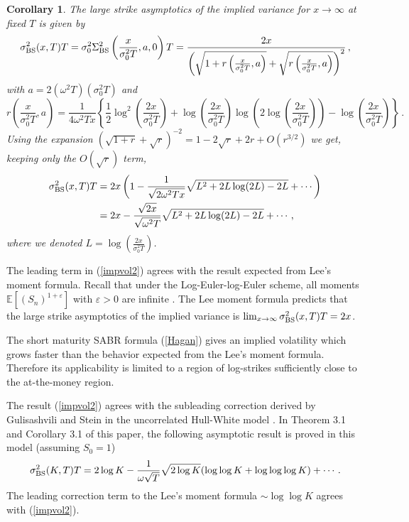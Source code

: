 \documentclass[11pt]{article}
\numberwithin{equation}{section}
\theoremstyle{plain}
\newtheorem{corollary}[theorem]{Corollary}
\begin{document}
\begin{corollary}
The large strike asymptotics of the implied variance for $x \to \infty$
at fixed $T$ is given by
\begin{equation}
\sigma_{\rm BS}^2(x,T) T= 
\sigma_0^2 \Sigma_{\rm BS}^2
\left( \frac{x}{\sigma_0^2 T},a,0\right) T =
\frac{2x}{\left(\sqrt{1+r\left(\frac{x}{\sigma_0^2 T},a\right)} 
 + \sqrt{r\left(\frac{x}{\sigma_0^2 T},a\right)}\right)^2} \,,
\end{equation}
with $a = 2(\omega^2 T)(\sigma_0^2 T)$ and 
\begin{equation}
r\left(\frac{x}{\sigma_0^2 T},a\right) = \frac{1}{4\omega^2 T x}
\left\{ \frac12 \log^2 \left( \frac{2x}{\sigma_0^2 T} \right) + 
\log\left( \frac{2x}{\sigma_0^2 T} \right)
\log\left( 2\log \left(\frac{2x}{\sigma_0^2 T} \right)\right) -
\log\left( \frac{2x}{\sigma_0^2 T} \right) \right\}\,.
\end{equation}
Using the expansion $(\sqrt{1+r} + \sqrt{r})^{-2} = 1 - 2\sqrt{r} + 2r + O(r^{3/2})$
we get, keeping only the $O(\sqrt{r})$ term,
\begin{align}\label{impvol2}
\sigma_{\rm BS}^2(x,T)T &= 2x \left( 1 - \frac{1}{\sqrt{2\omega^2 T x}}
\sqrt{L^2 + 2 L \log(2L) - 2L} + \cdots \right) \\
&= 2x - \frac{\sqrt{2x}}{\sqrt{\omega^2 T}} 
\sqrt{L^2 + 2 L \log(2L) - 2L} + \cdots\,, \nonumber
\end{align}
where we denoted $L=\log\left( \frac{2x}{\sigma_0^2 T}\right)$.
\end{corollary}

The leading term in (\ref{impvol2}) agrees with the result expected from Lee's moment 
formula. Recall that under the Log-Euler-log-Euler scheme, all moments $\mathbb{E}[(S_n)^{1+\varepsilon}]$ with
$\varepsilon>0$ are infinite \cite{PZStochVol}. The Lee moment formula 
\cite{Lee} predicts that the large strike asymptotics of the 
implied variance is $\lim_{x\to \infty} \sigma_{\rm BS}^2(x,T) T = 2x$. 

The short maturity SABR formula (\ref{Hagan}) gives an implied volatility which 
grows faster than
the behavior expected from the Lee's moment formula. Therefore its applicability
is limited to a region of log-strikes sufficiently close to the at-the-money
region.

The result (\ref{impvol2}) agrees with the subleading correction
derived by Gulisashvili and Stein in the uncorrelated Hull-White model 
\cite{GSHW}. In Theorem 3.1 and Corollary 3.1 of this paper, the following
asymptotic result is proved in this model (assuming $S_0=1$)
\begin{equation}
\sigma_{\rm BS}^2(K,T) T = 2\log K - \frac{1}{\omega\sqrt{T}} \sqrt{2\log K}
( \log\log K + \log\log\log K) + \cdots\,.
\end{equation}
The leading correction term to the Lee's moment formula $\sim \log\log K$ 
agrees with (\ref{impvol2}).
\end{document}
